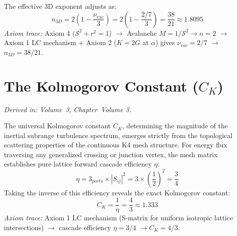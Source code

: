 The effective 3D exponent adjusts as:
\begin{equation}
    n_{3D} = 2 \left(1 - \frac{\nu_{\mathrm{vac}}}{3}\right) = 2\left(1 - \frac{2/7}{3}\right) = \frac{38}{21} \approx 1.8095
\end{equation}
\textit{Axiom trace:} Axiom 4 ($\mathcal{S}^2 + r^2 = 1$) $\rightarrow$ Avalanche $M = 1/\mathcal{S}^2 \rightarrow n=2$ $\rightarrow$ Axiom 1 LC mechanism + Axiom 2 ($K=2G$ at $\alpha$) gives $\nu_{vac}=2/7$ $\rightarrow$ $n_{3D} = 38/21$.

\section{The Kolmogorov Constant ($C_K$)}
\label{app:kolmogorov_constant}
\textit{Derived in: Volume~3, Chapter~Volume 3.}

The universal Kolmogorov constant $C_K$, determining the magnitude of the inertial subrange turbulence spectrum, emerges strictly from the topological scattering properties of the continuous K4 mesh structure. For energy flux traversing any generalized crossing or junction vertex, the mesh matrix establishes pure lattice forward cascade efficiency $\eta$:
\begin{equation}
    \eta = 3_{ports} \times |S_{ij}|^2 = 3 \times \left(\frac{1}{2}\right)^2 = \frac{3}{4}
\end{equation}
Taking the inverse of this efficiency reveals the exact Kolmogorov constant:
\begin{equation}
    C_K = \frac{1}{\eta} = \frac{4}{3} \approx 1.333
\end{equation}
\textit{Axiom trace:} Axiom 1 LC mechanism (S-matrix for uniform isotropic lattice intersections) $\rightarrow$ cascade efficiency $\eta = 3/4$ $\rightarrow C_K = 4/3$.
